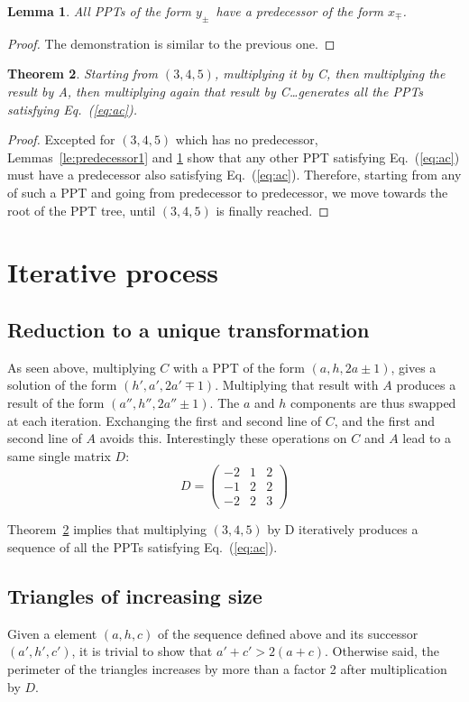 \documentclass[11pt, twoside, a4paper]{article}
\newtheorem{theorem}{Theorem}[section]
\newtheorem{lemma}[theorem]{Lemma}
\theoremstyle{definition}
\newcommand{\Eq}[1]{Eq.~(\ref{eq:#1})}
\newcommand{\Th}[1]{Theorem~\ref{th:#1}}
\newcommand{\xmp}{\ensuremath{x_\mp}}
\newcommand{\ypm}{\ensuremath{y_\pm}}
\begin{document}
\begin{lemma}\label{le:predecessor2}
All PPTs of the form \ypm\ have a predecessor of the form \xmp.
\end{lemma}
\begin{proof}The demonstration is similar to the previous one.\end{proof}

\begin{theorem}\label{th:PPT_branch}
Starting from $(3,4,5)$, multiplying it by C, then multiplying the result by A, then multiplying again that result by C\ldots generates all the PPTs satisfying \Eq{ac}.
\end{theorem}
\begin{proof}
Excepted for $(3, 4, 5)$ which has no predecessor, Lemmas~\ref{le:predecessor1} and \ref{le:predecessor2} show that any other PPT satisfying \Eq{ac} must have a predecessor also satisfying \Eq{ac}. Therefore, starting from any of such a PPT and going from predecessor to predecessor, we move towards the root of the PPT tree, until $(3, 4, 5)$ is finally reached.
\end{proof}

\section{Iterative process}
\subsection{Reduction to a unique transformation}
As seen above, multiplying $C$ with a PPT of the form $(a, h, 2a\pm1)$, gives a solution of the form $(h', a', 2a'\mp1)$. Multiplying that result with $A$ produces a result of the form $(a'', h'', 2a''\pm1)$. The $a$ and $h$ components are thus swapped at each iteration. Exchanging the first and second line of $C$, and the first and second line of $A$ avoids this. Interestingly these operations on $C$ and $A$ lead to a same single matrix $D$:
\[D = \left(\begin{matrix} -2 &  1 & 2 \\ -1 &  2 & 2 \\ -2 &  2 & 3 \end{matrix} \right)\]

\Th{PPT_branch} implies that multiplying $(3, 4, 5)$ by D iteratively produces a sequence of all the PPTs satisfying \Eq{ac}.

\subsection{Triangles of increasing size}
Given a element $(a, h, c)$ of the sequence defined above and its successor $(a', h', c')$, it is trivial to show that $a'+c'>2(a+c)$. Otherwise said, the perimeter of the triangles increases by more than a factor 2 after multiplication by $D$.
\end{document}
